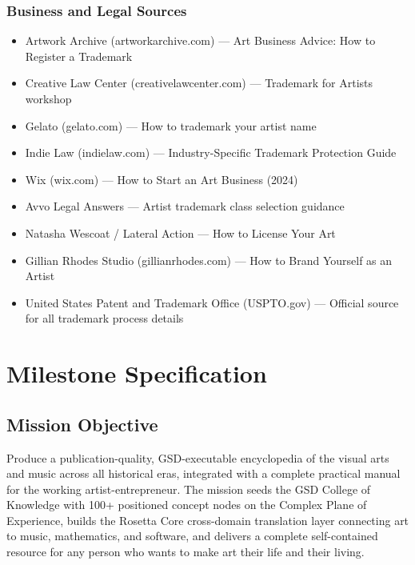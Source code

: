 \documentclass[11pt,letterpaper]{article}
\newcommand{\stageheader}[2]{%
  \noindent\colorbox{#2}{\makebox[\textwidth][l]{%
    \textcolor{white}{\bfseries\sffamily\hspace{6pt}#1\hspace{6pt}}}}%
  \vspace{0.5em}\par%
}
\begin{document}
\subsubsection*{Business and Legal Sources}
\begin{itemize}[noitemsep]
  \item Artwork Archive (artworkarchive.com) --- Art Business Advice: How to Register a Trademark
  \item Creative Law Center (creativelawcenter.com) --- Trademark for Artists workshop
  \item Gelato (gelato.com) --- How to trademark your artist name
  \item Indie Law (indielaw.com) --- Industry-Specific Trademark Protection Guide
  \item Wix (wix.com) --- How to Start an Art Business (2024)
  \item Avvo Legal Answers --- Artist trademark class selection guidance
  \item Natasha Wescoat / Lateral Action --- How to License Your Art
  \item Gillian Rhodes Studio (gillianrhodes.com) --- How to Brand Yourself as an Artist
  \item United States Patent and Trademark Office (USPTO.gov) --- Official source for all trademark process details
\end{itemize}

\newpage
\stageheader{STAGE 3 --- MISSION PACKAGE}{tertiary}

\section{Milestone Specification}

\subsection{Mission Objective}

Produce a publication-quality, GSD-executable encyclopedia of the visual arts and music across all historical eras, integrated with a complete practical manual for the working artist-entrepreneur. The mission seeds the GSD College of Knowledge with 100+ positioned concept nodes on the Complex Plane of Experience, builds the Rosetta Core cross-domain translation layer connecting art to music, mathematics, and software, and delivers a complete self-contained resource for any person who wants to make art their life and their living.
\end{document}

